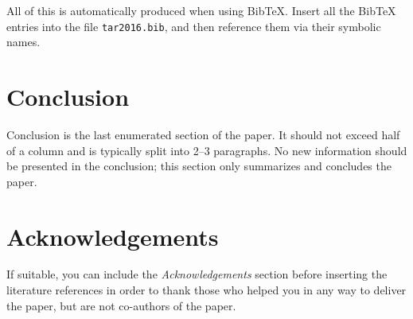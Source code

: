 \documentclass[10pt, a4paper]{article}
\begin{document}
All of this is automatically produced when using BibTeX. Insert all the BibTeX entries into the file \texttt{tar2016.bib}, and then reference them via their symbolic names.
	
\section{Conclusion}

Conclusion is the last enumerated section of the paper. It should not exceed half of a column and is typically split into 2--3 paragraphs. No new information should be presented in the conclusion; this section only summarizes and concludes the paper.

\section*{Acknowledgements}

If suitable, you can include the \textit{Acknowledgements} section before inserting the literature references  in order to thank those who helped you in any way to deliver the paper, but are not co-authors of the paper.




\end{document}
